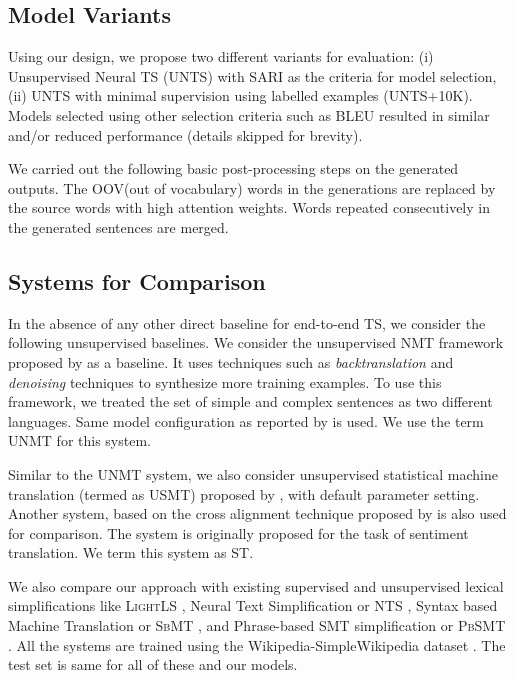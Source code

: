 \documentclass[11pt,a4paper]{article}
\begin{document}
\subsection{Model Variants}
Using our design, we propose two different variants for evaluation: (i) Unsupervised Neural TS (\textsc{UNTS}) with SARI as the criteria for model selection, (ii) \textsc{UNTS} with minimal supervision using  labelled examples (UNTS+10K). Models selected using other selection criteria such as BLEU resulted in similar and/or reduced performance (details skipped for brevity).

We carried out the following basic post-processing steps on the generated outputs. The OOV(out of vocabulary) words in the generations are replaced by the source words with high attention weights. Words repeated consecutively  in the generated sentences are merged.

\subsection{Systems for Comparison}
\label{exp:exp}
In the absence of any other direct baseline for end-to-end TS, we consider the following unsupervised baselines. We consider the unsupervised NMT framework proposed by \cite{artetxe2018iclr} as a baseline. It uses techniques such as \textit{backtranslation} and \textit{denoising} techniques to synthesize more training examples. To use this framework, we treated the set of simple and complex sentences as two different languages. Same model configuration as reported by   is used. We use the term \textsc{UNMT} for this system. 

Similar to the \textsc{UNMT} system, we also consider unsupervised statistical machine translation (termed as \textsc{USMT}) proposed by , with default parameter setting. Another system, based on the cross alignment technique proposed by  is also used for comparison. The system is originally proposed for the task of sentiment translation. We term this system as \textsc{ST}.

We also compare our approach with existing supervised and unsupervised lexical simplifications like \textsc{LightLS} \cite{glavavs2015simplifying}, Neural Text Simplification or \textsc{NTS} \cite{nisioi2017exploring}, Syntax based Machine Translation or \textsc{SbMT} \cite{xu2016optimizing}, and Phrase-based SMT simplification or \textsc{PbSMT} \cite{wubben2012sentence}. All the systems are trained using the Wikipedia-SimpleWikipedia dataset \cite{hwang2015aligning}. The test set is same for all of these and our models.
\end{document}
